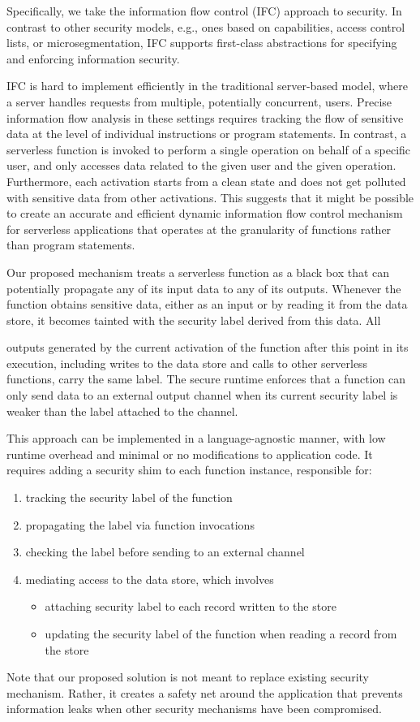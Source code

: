 Specifically, we take the information flow control (IFC) approach to security. In contrast to other security models, e.g., ones based on capabilities, access control lists, or microsegmentation, IFC supports first-class abstractions for specifying and enforcing information security.

IFC is hard to implement efficiently in the traditional server-based model, where a server handles requests from multiple, potentially concurrent, users. Precise information flow analysis in these settings requires tracking the flow of sensitive data at the level of individual instructions or program statements. In contrast, a serverless function is invoked to perform a single operation on behalf of a specific user, and only accesses data related to the given user and the given operation. Furthermore, each activation starts from a clean state and does not get polluted with sensitive data from other activations. This suggests that it might be possible to create an accurate and efficient dynamic information flow control mechanism for serverless applications that operates at the granularity of functions rather than program statements.

Our proposed mechanism treats a serverless function as a black box that can potentially propagate any of its input data to any of its outputs. Whenever the function obtains sensitive data, either as an input or by reading it from the data store, it becomes tainted with the security label derived from this data. All

outputs generated by the current activation of the function after this point in its execution, including writes to the data store and calls to other serverless functions, carry the same label. The secure runtime enforces that a function can only send data to an external output channel when its current security label is weaker than the label attached to the channel.

This approach can be implemented in a language-agnostic manner, with low runtime overhead and minimal or no modifications to application code. It requires adding a security shim to each function instance, responsible for:

\begin{enumerate}
    \item tracking the security label of the function
    \item propagating the label via function invocations
    \item checking the label before sending to an external channel
    \item mediating access to the data store, which involves
    \begin{itemize}
        \item attaching security label to each record written to the store
        \item updating the security label of the function when reading a record from the store
    \end{itemize}
\end{enumerate}

Note that our proposed solution is not meant to replace existing security mechanism. Rather, it creates a safety net around the application that prevents information leaks when other security mechanisms have been compromised.
